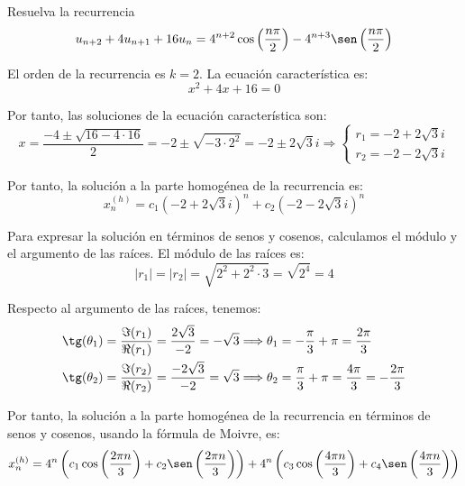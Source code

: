 \begin{ejercicio}
    Resuelva la recurrencia
    \begin{equation*}
        u_{n+2} + 4u_{n+1} + 16u_n = 4^{n+2} \cos \left(\dfrac{n\pi}{2} \right) -4^{n+3} \sen \left(\dfrac{n\pi}{2} \right) 
    \end{equation*}

    El orden de la recurrencia es $k=2$. La ecuación característica es:
    \begin{equation*}
        x^2 + 4x + 16 = 0
    \end{equation*}

    Por tanto, las soluciones de la ecuación característica son:
    \begin{equation*}
        x = \dfrac{-4\pm \sqrt{16 - 4\cdot 16}}{2}
        = -2\pm \sqrt{-3\cdot 2^2}
        = -2\pm 2\sqrt{3}i
        \Longrightarrow
        \left\{\begin{array}{l}
            r_1 = -2 + 2\sqrt{3}i \\
            r_2 = -2 - 2\sqrt{3}i
        \end{array}\right.
    \end{equation*}

    Por tanto, la solución a la parte homogénea de la recurrencia es:
    \begin{equation*}
        x_n^{(h)} = c_1(-2+2\sqrt{3}i)^n + c_2(-2-2\sqrt{3}i)^n
    \end{equation*}

    Para expresar la solución en términos de senos y cosenos, calculamos el módulo y el argumento de las raíces.
    El módulo de las raíces es:
    \begin{equation*}
        |r_1| = |r_2| = \sqrt{2^2 + 2^2\cdot 3} = \sqrt{2^4}=4
    \end{equation*}

    Respecto al argumento de las raíces, tenemos:
    \begin{align*}
        \tg(\theta_1) &= \frac{\Im(r_1)}{\Re(r_1)} = \frac{2\sqrt{3}}{-2} = -\sqrt{3} \Longrightarrow \theta_1 = -\frac{\pi}{3} + \pi = \frac{2\pi}{3}\\
        \tg(\theta_2) &= \frac{\Im(r_2)}{\Re(r_2)} = \frac{-2\sqrt{3}}{-2} = \sqrt{3} \Longrightarrow \theta_2 = \frac{\pi}{3} + \pi = \frac{4\pi}{3} = -\frac{2\pi}{3}
    \end{align*}

    Por tanto, la solución a la parte homogénea de la recurrencia en términos de senos y cosenos, usando la fórmula de Moivre, es:
    \begin{equation*}
        x_n^{(h)} = 4^n\left(c_1\cos\left(\frac{2\pi n}{3}\right) + c_2\sen\left(\frac{2\pi n}{3}\right)\right)
        + 4^n\left(c_3\cos\left(\frac{4\pi n}{3}\right) + c_4\sen\left(\frac{4\pi n}{3}\right)\right)
    \end{equation*}


\end{ejercicio}
